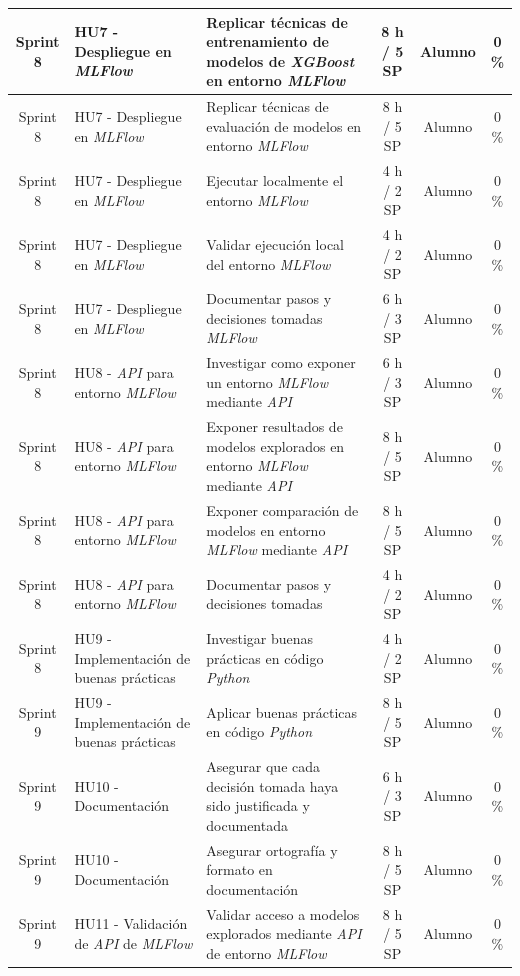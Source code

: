 \documentclass[
11pt, %
]{charter}
\begin{document}
\begin{xltabular}{\linewidth}{@{}|c|X|X|c|c|c|@{}}
Sprint 8 & HU7 - Despliegue en \textit{MLFlow}  & Replicar técnicas de entrenamiento de modelos de \textit{XGBoost} en entorno \textit{MLFlow}  & 8 h / 5 SP & Alumno & 0 \%\\ \hline
Sprint 8 & HU7 - Despliegue en \textit{MLFlow}  & Replicar técnicas de evaluación de modelos en entorno \textit{MLFlow}  & 8 h / 5 SP & Alumno & 0 \%\\ \hline
Sprint 8 & HU7 - Despliegue en \textit{MLFlow}  & Ejecutar localmente el entorno \textit{MLFlow}  & 4 h / 2 SP & Alumno & 0 \% \\ \hline
Sprint 8 & HU7 - Despliegue en \textit{MLFlow}  & Validar ejecución local del entorno \textit{MLFlow}  & 4 h / 2 SP & Alumno & 0 \% \\ \hline
Sprint 8 & HU7 - Despliegue en \textit{MLFlow}  & Documentar pasos y decisiones tomadas \textit{MLFlow}  & 6 h / 3 SP & Alumno & 0 \% \\ \hline
Sprint 8 & HU8 - \textit{API} para entorno \textit{MLFlow} & Investigar como exponer un entorno \textit{MLFlow} mediante \textit{API}  & 6 h / 3 SP & Alumno & 0 \% \\ \hline
Sprint 8 & HU8 - \textit{API} para entorno \textit{MLFlow} & Exponer resultados de modelos explorados en entorno \textit{MLFlow} mediante \textit{API}  & 8 h / 5 SP & Alumno & 0 \%\\ \hline
Sprint 8 & HU8 - \textit{API} para entorno \textit{MLFlow} & Exponer comparación de modelos en entorno \textit{MLFlow} mediante \textit{API}  & 8 h / 5 SP & Alumno & 0 \%\\ \hline
Sprint 8 & HU8 - \textit{API} para entorno \textit{MLFlow} & Documentar pasos y decisiones tomadas  & 4 h / 2 SP & Alumno & 0 \%\\ \hline
Sprint 8 & HU9 - Implementación de buenas prácticas  & Investigar buenas prácticas en código \textit{Python}  & 4 h / 2 SP & Alumno & 0 \%\\ \hline
Sprint 9 & HU9 - Implementación de buenas prácticas  & Aplicar buenas prácticas en código \textit{Python}  & 8 h / 5 SP & Alumno & 0 \% \\ \hline
Sprint 9 & HU10 - Documentación  & Asegurar que cada decisión tomada haya sido justificada y documentada  & 6 h / 3 SP & Alumno & 0 \% \\ \hline
Sprint 9 & HU10 - Documentación  & Asegurar ortografía y formato en documentación  & 8 h / 5 SP & Alumno & 0 \% \\ \hline
Sprint 9 & HU11 - Validación de \textit{API} de \textit{MLFlow} & Validar acceso a modelos explorados mediante \textit{API} de entorno \textit{MLFlow}  & 8 h / 5 SP & Alumno & 0 \% \\ \hline

\end{xltabular}
\end{document}
